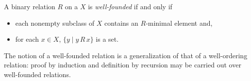 \documentclass[12pt]{article}
\begin{document}

A binary relation $R$ on a  $X$ is \emph{well-founded} if and only if 

\begin{itemize}
\item each nonempty subclass of $X$ contains an $R$-minimal element and, 
\item for each $x \in X$, $\lbrace y \mid y\,R\,x \rbrace$ is a set.
\end{itemize}

 The notion of a well-founded relation is a generalization of that of a well-ordering relation: proof by induction and definition by recursion may be carried out over well-founded relations. 
\end{document}

